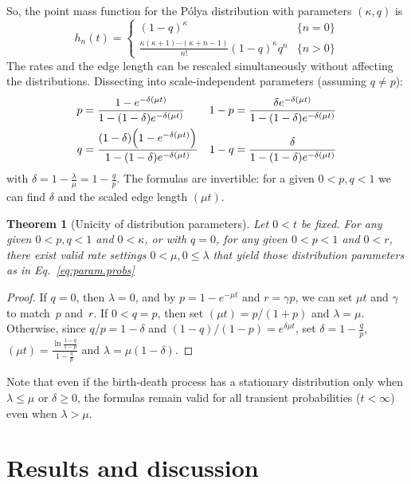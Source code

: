 \documentclass{elsarticle}
\newtheorem{theorem}{Theorem}
\begin{document}
So, the point mass function for the P{\'o}lya distribution with parameters $(\kappa, q)$ 
is 
\[
h_n(t) = \begin{cases}
	(1-q)^\kappa & \{n=0\}\\
	\frac{\kappa(\kappa+1)\dotsm (\kappa+n-1)}{n!} (1-q)^\kappa q^n & \{n>0\} 
	\end{cases}
\]
The rates and the edge length can be rescaled simultaneously without 
affecting the distributions. Dissecting into scale-independent parameters
(assuming $q\ne p$):
\begin{align*} 
p & = \frac{1-e^{-\delta(\mu t)}}{1-(1-\delta)e^{-\delta(\mu t)}} & 1-p & = \frac{\delta e^{-\delta (\mu t)}}{1-(1-\delta)e^{-\delta(\mu t)}}\\
q & = \frac{(1-\delta)\Bigl(1-e^{-\delta(\mu t)}\Bigr)}{1-(1-\delta)e^{-\delta(\mu t)}}
	& 1- q & = \frac{\delta}{1-(1-\delta)e^{-\delta(\mu t)}}
\end{align*}
with $\delta = 1-\frac{\lambda}{\mu} = 1-\frac{q}{p}$. 
The formulas are invertible: for a given $0< p,q<1$ we can find 
$\delta$ and the scaled edge length $(\mu t)$. 
\begin{theorem}[Unicity of distribution parameters]\label{tm:param.probs}
Let $0<t$ be fixed. For any given $0<p,q<1$ and $0<\kappa$, 
or with $q=0$, for any given $0<p<1$ and $0<r$,
there exist valid rate settings $0<\mu, 0\le \lambda$  
that yield those distribution parameters as in Eq.~\eqref{eq:param.probs} 
\end{theorem}
\begin{proof}
If $q=0$, then $\lambda=0$, and by $p=1-e^{-\mu t}$ and $r=\gamma p$, 
we can set $\mu t$ and $\gamma$ to match~$p$ and~$r$.   
If $0<q=p$, then set $(\mu t)=p/(1+p)$ and $\lambda=\mu$.  
Otherwise, since $q/p = 1-\delta$ and $(1-q)/(1-p) = e^{\delta\mu t}$, 
set $\delta = 1-\frac{q}{p}$,  
$(\mu t) = \frac{\ln \frac{1-q}{1-p}}{1-\frac{q}{p}}$ and $\lambda = \mu (1-\delta)$.
\end{proof}
Note that even if the birth-death process has a stationary distribution only when 
$\lambda \le \mu$ or $\delta\ge 0$, the formulas remain 
valid for all transient probabilities ($t<\infty$) 
even when $\lambda > \mu$. 
%
\section{Results and discussion}
\end{document}
